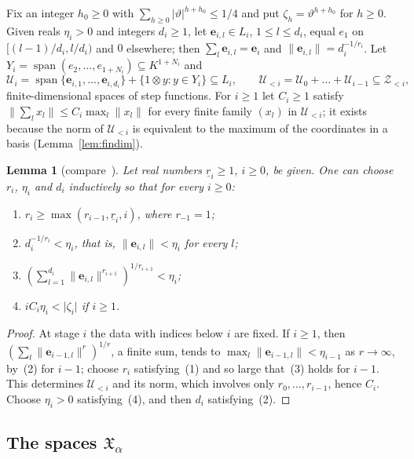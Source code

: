 \documentclass[11pt]{amsart}
\newtheorem{lemma}[theorem]{Lemma}
\theoremstyle{definition}
\theoremstyle{remark}
\numberwithin{equation}{section}
\newcommand{\spn}{\operatorname{span}}
\newcommand{\abs}[1]{\lvert #1\rvert}
\newcommand{\norm}[1]{\lVert #1\rVert}
\theoremstyle{plain}
\theoremstyle{definition}
\theoremstyle{plain}
\newcommand{\fX}{\mathfrak X}
\begin{document}
Fix an integer $h_0\ge0$ with $\sum_{h\ge0}\abs\vartheta^{h+h_0}\le1/4$ and put $\zeta_h=\vartheta^{h+h_0}$ for $h\ge0$.
Given reals $\eta_i>0$ and integers $d_i\ge1$, let $\mathbf e_{i,l}\in L_i$, $1\le l\le d_i$,
equal $e_1$ on $[(l-1)/d_i,l/d_i)$ and $0$ elsewhere; then $\sum_l\mathbf e_{i,l}=\mathbf e_i$ and
$\norm{\mathbf e_{i,l}}=d_i^{-1/r_i}$. Let $Y_i=\spn(e_2,\dots,e_{1+N_i})\subseteq K^{1+N_i}$ and
\[
 \mathcal U_i=\spn\{\mathbf e_{i,1},\dots,\mathbf e_{i,d_i}\}+\{1\otimes y:y\in Y_i\}\subseteq L_i,\qquad
 \mathcal U_{<i}=\mathcal U_0+\dots+\mathcal U_{i-1}\subseteq\mathcal Z_{<i},
\]
finite-dimensional spaces of step functions. For $i\ge1$ let $C_i\ge1$ satisfy $\norm{\sum_lx_l}\le C_i\max_l\norm{x_l}$
for every finite family $(x_l)$ in $\mathcal U_{<i}$; it exists because the norm of $\mathcal U_{<i}$ is equivalent to
the maximum of the coordinates in a basis (Lemma~\ref{lem:findim}).

\begin{lemma}[compare~{\cite[Lemma~3.1]{KR}}]\label{rig:lem:choices}
Let real numbers $\underline r_i\ge1$, $i\ge0$, be given. One can choose $r_i$, $\eta_i$ and $d_i$ inductively so that
for every $i\ge0$:
\begin{enumerate}
\item $r_i\ge\max(r_{i-1},\underline r_i,i)$, where $r_{-1}=1$;
\item $d_i^{-1/r_i}<\eta_i$, that is, $\norm{\mathbf e_{i,l}}<\eta_i$ for every $l$;
\item $(\sum_{l=1}^{d_i}\norm{\mathbf e_{i,l}}^{r_{i+1}})^{1/r_{i+1}}<\eta_i$;
\item $iC_i\eta_i<\abs{\zeta_i}$ if $i\ge1$.
\end{enumerate}
\end{lemma}

\begin{proof}
At stage $i$ the data with indices below $i$ are fixed. If $i\ge1$, then $(\sum_l\norm{\mathbf e_{i-1,l}}^r)^{1/r}$, a
finite sum, tends to $\max_l\norm{\mathbf e_{i-1,l}}<\eta_{i-1}$ as $r\to\infty$, by~(2) for $i-1$; choose $r_i$
satisfying~(1) and so large that~(3) holds for $i-1$. This determines $\mathcal U_{<i}$ and its norm, which involves
only $r_0,\dots,r_{i-1}$, hence $C_i$.
Choose $\eta_i>0$ satisfying~(4), and then $d_i$ satisfying~(2).
\end{proof}

\subsection{The spaces \texorpdfstring{$\fX_\alpha$}{X\_alpha}}\label{rig:ssec:spaces}
\end{document}
